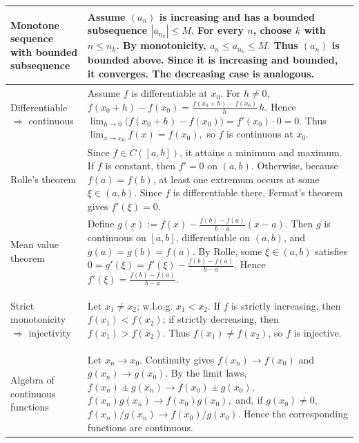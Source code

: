 {\begin{minipage}[t]{0.495\textwidth}
\begin{tabular}{
    @{}
    >{\bfseries\raggedright\arraybackslash}p{3.0cm}
    >{\raggedright\arraybackslash}p{10.4cm}
    @{}
}
\midrule

Monotone sequence with bounded subsequence &
Assume $(a_n)$ is increasing and has a bounded subsequence
$
|a_{n_k}|\le M.
$
For every $n$, choose $k$ with $n\le n_k$. By monotonicity,
$
a_n\le a_{n_k}\le M.
$
Thus $(a_n)$ is bounded above. Since it is increasing and bounded, it
converges. The decreasing case is analogous.
\\

\midrule

Differentiable $\Rightarrow$ continuous &
Assume $f$ is differentiable at $x_0$. For $h\neq0$,
$
f(x_0+h)-f(x_0)
=
\frac{f(x_0+h)-f(x_0)}{h}\,h.
$
Hence
$
\lim_{h\to0}\bigl(f(x_0+h)-f(x_0)\bigr)
=
f'(x_0)\cdot0=0.
$
Thus
$
\lim_{x\to x_0}f(x)=f(x_0),
$
so $f$ is continuous at $x_0$.
\\

\midrule

Rolle's theorem &
Since $f\in C([a,b])$, it attains a minimum and maximum. If $f$ is
constant, then $f'=0$ on $(a,b)$. Otherwise, because $f(a)=f(b)$, at
least one extremum occurs at some $\xi\in(a,b)$. Since $f$ is
differentiable there, Fermat's theorem gives
$
f'(\xi)=0.
$
\\

\midrule

Mean value theorem &
Define
$
g(x):=f(x)-\frac{f(b)-f(a)}{b-a}(x-a).
$
Then $g$ is continuous on $[a,b]$, differentiable on $(a,b)$, and
$
g(a)=g(b)=f(a).
$
By Rolle, some $\xi\in(a,b)$ satisfies
$
0=g'(\xi)
=
f'(\xi)-\frac{f(b)-f(a)}{b-a}.
$
Hence
$
f'(\xi)=\frac{f(b)-f(a)}{b-a}.
$
\\

\midrule

Strict monotonicity $\Rightarrow$ injectivity &
Let $x_1\neq x_2$; w.l.o.g. $x_1<x_2$. If $f$ is strictly increasing,
then $f(x_1)<f(x_2)$; if strictly decreasing, then
$f(x_1)>f(x_2)$. Thus $f(x_1)\neq f(x_2)$, so $f$ is injective.
\\

\midrule

Algebra of continuous functions &
Let $x_n\to x_0$. Continuity gives
$
f(x_n)\to f(x_0)
$
and
$
g(x_n)\to g(x_0).
$
By the limit laws,
$
f(x_n)\pm g(x_n)\to f(x_0)\pm g(x_0),
$
$
f(x_n)g(x_n)\to f(x_0)g(x_0),
$
and, if $g(x_0)\neq0$,
$
f(x_n)/g(x_n)\to f(x_0)/g(x_0).
$
Hence the corresponding functions are continuous.
\\

\bottomrule
\end{tabular}

\end{minipage}
}